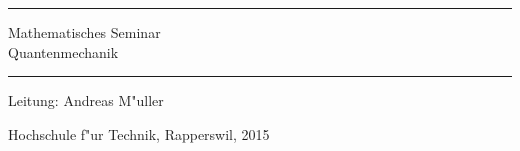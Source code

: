 \documentclass{book}
\begin{document}
\pagestyle{fancy}
\frontmatter
\newcommand\HRule{\noindent\rule{\linewidth}{1.5pt}}
\begin{titlepage}
\HRule
\vspace*{5pt}
\begin{flushright}
{
\LARGE
Mathematisches Seminar\\
\vspace*{20pt}
\Huge
Quantenmechanik%
}
\vspace*{5pt}
\end{flushright}
\HRule
\begin{flushright}
\vspace{60pt}
\Large
Leitung: Andreas M"uller\\
\vspace{40pt}
\Large
\end{flushright}
\begin{center}
Hochschule f"ur Technik, Rapperswil, 2015
\end{center}
\end{titlepage}
\hypersetup{
    colorlinks=true,
    linktoc=all,
    linkcolor=blue
}
\newenvironment{beispiele}{
\bgroup\smallskip\parindent0pt\bf Beispiele\egroup

\begin{list}{\arabic{beispiel}.}
  {\usecounter{beispiel}
  \setlength{\labelsep}{5mm}
  \setlength{\rightmargin}{0pt}
}}{\end{list}}
\newenvironment{uebungsaufgaben}{
\begin{list}{\arabic{uebungsaufgabe}.}
  {\usecounter{uebungsaufgabe}
  \setlength{\labelwidth}{2cm}
  \setlength{\leftmargin}{0pt}
  \setlength{\labelsep}{5mm}
  \setlength{\rightmargin}{0pt}
  \setlength{\itemindent}{0pt}
}}{\end{list}\vfill\pagebreak}
\newenvironment{teilaufgaben}{
\begin{enumerate}
\renewcommand{\labelenumi}{\alph{enumi})}
}{\end{enumerate}}
\def\swallow#1{
}
\newenvironment{loesung}{%
\begin{proof}[L"osung]%
\renewcommand{\qedsymbol}{$\bigcirc$}
}{\end{proof}}
\newenvironment{diskussion}{}{}
\def\keineloesungen{%
\renewenvironment{loesung}{\swallow\begingroup}{\endgroup}%
\renewenvironment{diskussion}{\swallow\begingroup}{\endgroup}%
}
\newenvironment{beispiel}{%
\begin{proof}[Beispiel]%
\renewcommand{\qedsymbol}{$\bigcirc$}
}{\end{proof}}
\end{document}
